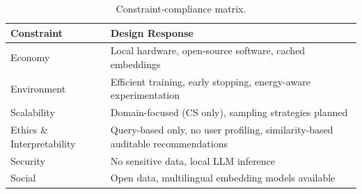\begin{table}[htbp]
\caption{Constraint-compliance matrix.}
\footnotesize
\centering
\label{tab:feasibility}
\begin{tabular}{ll}
\toprule
\textbf{Constraint} & \textbf{Design Response} \\
\midrule
Economy & Local hardware, open-source software, cached embeddings \\
Environment & Efficient training, early stopping, energy-aware experimentation \\
Scalability & Domain-focused (CS only), sampling strategies planned \\
Ethics \& Interpretability & Query-based only, no user profiling, similarity-based auditable recommendations \\
Security & No sensitive data, local LLM inference \\
Social & Open data, multilingual embedding models available \\
\bottomrule
\end{tabular}
\end{table}
